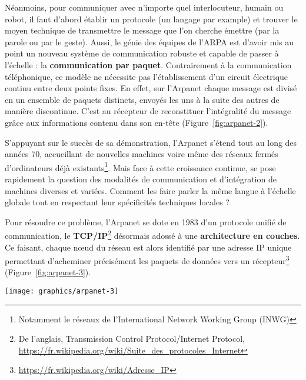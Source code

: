 \documentclass[symmetric,justified,marginals=raggedouter]{tufte-book}
\begin{document}
Néanmoins, pour communiquer avec n'importe quel interlocuteur, humain ou robot, il faut d'abord établir un protocole (un langage par example) et trouver le moyen technique de transmettre le message que l'on cherche émettre (par la parole ou par le geste). Aussi, le génie des équipes de l'ARPA est d'avoir mis au point un nouveau système de communication robuste et capable de passer à l'échelle : la \textbf{communication par paquet}. Contrairement à la communication téléphonique, ce modèle ne nécessite pas l'établissement d'un circuit électrique continu entre deux points fixes. En effet, sur l'Arpanet chaque message est divisé en un ensemble de paquets distincts, envoyés les uns à la suite des autres de manière discontinue. C'est au récepteur de reconstituer l'intégralité du message grâce aux informations contenu dans son en-tête (Figure~\ref{fig:arpanet-2}). 

S'appuyant sur le succès de sa démonstration, l'Arpanet s'étend tout au long des années 70, accueillant de nouvelles machines voire même des réseaux fermés d'ordinateurs déjà existants\footnote{\RaggedOuter Notamment le réseaux de l'International Network Working Group (INWG)}. Mais face à cette croissance continue, se pose rapidement la question des modalités de communication et d'intégration de machines diverses et variées. Comment les faire parler la même langue à l'échelle globale tout en respectant leur spécificités techniques locales ? 

Pour résoudre ce problème, l'Arpanet se dote en 1983 d'un protocole unifié de communication, le \textbf{TCP/IP}\footnote{\RaggedOuter De l'anglais, Transmission Control Protocol/Internet Protocol, \url{https://fr.wikipedia.org/wiki/Suite\_des\_protocoles\_Internet}} désormais adossé à une \textbf{architecture en couches}. Ce faisant, chaque nœud du réseau est alors identifié par une adresse IP unique permettant d'acheminer précisément les paquets de données vers un récepteur\footnote{\RaggedOuter \url{https://fr.wikipedia.org/wiki/Adresse\_IP}} (Figure~\ref{fig:arpanet-3}).  

\begin{figure*}
  \texttt{[image: graphics/arpanet-3]}
  \caption{Cheminement d'un message à travers un réseau de type Arpanet, suivant le protocole TCP/IP}
  \label{fig:arpanet-3}
\end{figure*} 
\end{document}
